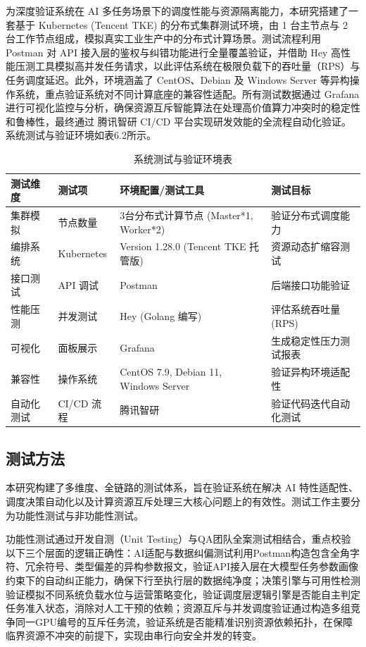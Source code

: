 为深度验证系统在 AI 多任务场景下的调度性能与资源隔离能力，本研究搭建了一套基于 Kubernetes (Tencent TKE) 的分布式集群测试环境，由 1 台主节点与 2 台工作节点组成，模拟真实工业生产中的分布式计算场景。测试流程利用 Postman 对 API 接入层的鉴权与纠错功能进行全量覆盖验证，并借助 Hey 高性能压测工具模拟高并发任务请求，以此评估系统在极限负载下的吞吐量（RPS）与任务调度延迟。此外，环境涵盖了 CentOS、Debian 及 Windows Server 等异构操作系统，重点验证系统对不同计算底座的兼容性适配。所有测试数据通过 Grafana 进行可视化监控与分析，确保资源互斥智能算法在处理高价值算力冲突时的稳定性和鲁棒性，最终通过 腾讯智研 CI/CD 平台实现研发效能的全流程自动化验证。系统测试与验证环境如表6.2所示。

\begin{table}[htbp]
\centering
\caption{系统测试与验证环境表}
\begin{tabularx}{\textwidth}{llXl}
\toprule
\textbf{测试维度} & \textbf{测试项} & \textbf{环境配置/测试工具} & \textbf{测试目标} \\
\midrule
集群模拟 & 节点数量 & 3台分布式计算节点 (Master*1, Worker*2) & 验证分布式调度能力 \\
编排系统 & Kubernetes & Version 1.28.0 (Tencent TKE 托管版) & 资源动态扩缩容测试 \\
接口测试 & API 调试 & Postman & 后端接口功能验证 \\
性能压测 & 并发测试 & Hey (Golang 编写) & 评估系统吞吐量 (RPS) \\
可视化 & 面板展示 & Grafana & 生成稳定性压力测试报表 \\
兼容性 & 操作系统 & CentOS 7.9, Debian 11, Windows Server & 验证异构环境适配性 \\
自动化测试 & CI/CD 流程 & 腾讯智研 & 验证代码迭代自动化测试 \\
\bottomrule
\end{tabularx}
\end{table}

\subsection{测试方法}

本研究构建了多维度、全链路的测试体系，旨在验证系统在解决 AI 特性适配性、调度决策自动化以及计算资源互斥处理三大核心问题上的有效性。测试工作主要分为功能性测试与非功能性测试。

功能性测试通过开发自测（Unit Testing）与QA团队全案测试相结合，重点校验以下三个层面的逻辑正确性：AI适配与数据纠偏测试利用Postman构造包含全角字符、冗余符号、类型偏差的异构参数报文，验证API接入层在大模型任务参数画像约束下的自动纠正能力，确保下行至执行层的数据纯净度；决策引擎与可用性检测验证模拟不同系统负载水位与运营策略变化，验证调度层逻辑引擎是否能自主判定任务准入状态，消除对人工干预的依赖；资源互斥与并发调度验证通过构造多组竞争同一GPU编号的互斥任务流，验证系统是否能精准识别资源依赖拓扑，在保障临界资源不冲突的前提下，实现由串行向安全并发的转变。


